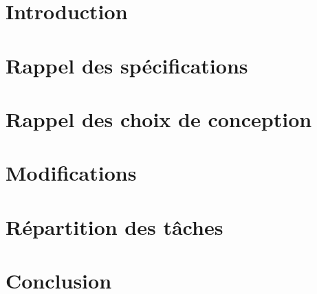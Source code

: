 \documentclass[asi]{documentLong}
\begin{document}
\couverture{}

\informationsGenerales{}

\tableofcontents{}

\newpage

\chapter{Introduction}

\chapter{Rappel des spécifications}

\chapter{Rappel des choix de conception}

\chapter{Modifications}

\chapter{Répartition des tâches}


\chapter{Conclusion}


\pageQuatriemeCouverture{}
\end{document}

